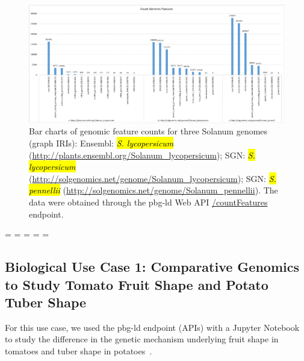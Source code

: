 \documentclass[applsci,article,accept,moreauthors,pdftex]{Definitions/mdpi}
\begin{document}
{%
\begin{figure}[H]
\centering
\includegraphics[scale=0.8]{Figure5.pdf}
\caption{Bar charts of genomic feature counts for three Solanum genomes (graph IRIs):
Ensembl: \emph{\hl{S. lycopersicum} %
} (\url{http://plants.ensembl.org/Solanum_lycopersicum});
SGN:  \emph{\hl{S. lycopersicum}} (\url{http://solgenomics.net/genome/Solanum_lycopersicum});
SGN: \emph{\hl{S. pennellii}} (\url{http://solgenomics.net/genome/Solanum_pennellii}). {The data were obtained through the pbg-ld Web API} \href{http:\/\/localhost:8088\/api-local\/\#\/Count\%20genomic\%20features\/get_countFeatures}{/countFeatures} {endpoint.}}
\label{Figure5}
\end{figure}

\newpage
\restoregeometry
\paperwidth=\pdfpageheight
\paperheight=\pdfpagewidth
\pdfpageheight=\paperheight
\pdfpagewidth=\paperwidth
\headwidth=\textwidth




\subsection{Biological Use Case 1: Comparative Genomics to Study Tomato Fruit Shape and Potato Tuber Shape}

For this use case, we used the pbg-ld endpoint (APIs) with a Jupyter Notebook~\cite{kluyver2016jupyter} to study the difference in the genetic mechanism underlying fruit shape in tomatoes and tuber shape in potatoes~\cite {Noteboook:example1}.

}
\end{document}
